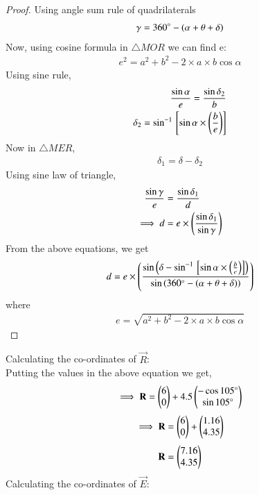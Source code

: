 \documentclass[journal,12pt,twocolumn]{IEEEtran}
\begin{document}
\begin{proof}
Using angle sum rule of quadrilaterals
\begin{align}
\gamma=360\degree-(\alpha+\theta+\delta)
\end{align}
 Now, using cosine formula in $\triangle MOR$ we can find e:
\begin{align}
 e^2=
a^2+b^2-2\times a \times b\cos{\alpha}
\end{align}
Using sine rule,
\begin{align}
    \frac{\sin{\alpha}}{e}=\frac{\sin{\delta_2}}{b}\\
    \delta_2=\sin^{-1}{}\left[\sin{\alpha}\times \left(\frac{b}{e}\right)\right]\\
\end{align}
  Now in $\triangle MER$,
  \begin{align}
  \delta_1=\delta-\delta_2
  \end{align}
Using sine law of triangle,
\begin{align}
    \frac{\sin{\gamma}}{e}&=\frac{\sin{\delta_1}}{d}\\
    \implies d&=e\times \left(\frac{\sin{\delta_1}}{\sin{\gamma}}\right)
\end{align}
From the above equations, we get
\begin{align}
d=e \times \left(\frac{\sin\left({\delta-\sin^{-1}{}\left[\sin{\alpha}\times \left(\frac{b}{e}\right)\right]}\right)}{\sin\left({360\degree-(\alpha+\theta+\delta)}\right)}\right)
\end{align}
where
\begin{align}
    e=\sqrt{a^2+b^2-2\times a \times b\cos{\alpha}}
\end{align}
\end{proof}
  Calculating the co-ordinates of $\vec{R}$:\\
 Putting the values in the above equation we get,
 \begin{align}
     \implies \mathbf{R}= \begin{pmatrix}6\\0\end{pmatrix}+4.5 \begin{pmatrix}-\cos 105\degree\\ \sin 105\degree\end{pmatrix}
 \end{align}
 \begin{align}
     \implies \mathbf{R}= \begin{pmatrix}6\\0\end{pmatrix}+\begin{pmatrix}1.16\\4.35\end{pmatrix}
 \end{align}
 \begin{align}
     \mathbf{R}= \begin{pmatrix}7.16\\4.35\end{pmatrix}
 \end{align}
       Calculating the co-ordinates of $\vec{E}$:\\
\end{document}
